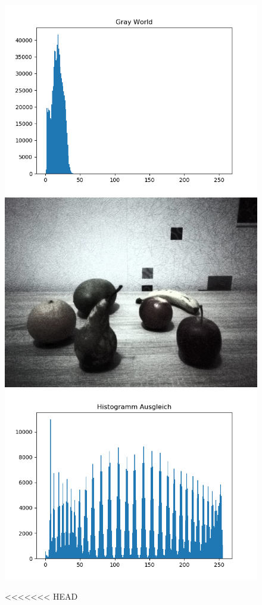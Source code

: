 \documentclass[a4paper,12pt,oneside]{article}
\begin{document}
\begin{figure}[htbp]
\begin{minipage}{0.49\textwidth}
\end{minipage}
\begin{minipage}{0.49\textwidth}
\includegraphics[width=\textwidth]{Sources/Anhang/resize_0250_GW.png}
\end{minipage}
\begin{minipage}{0.49\textwidth}
\includegraphics[width=.8\textwidth]{Sources/Anhang/resize_0250_HA.jpg}
\end{minipage}
\begin{minipage}{0.49\textwidth}
\includegraphics[width=\textwidth]{Sources/Anhang/resize_0250_HA.png}
\end{minipage}
<<<<<<< HEAD
\end{figure}
\end{document}
